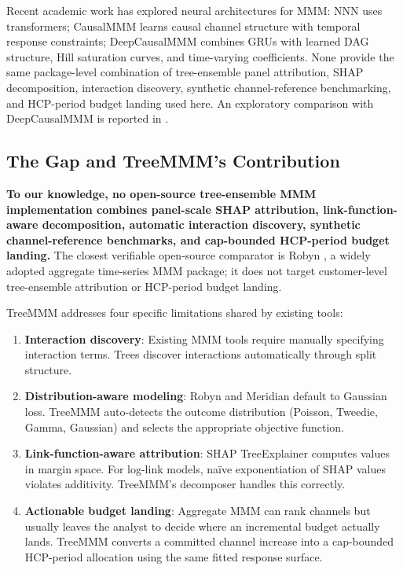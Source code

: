 \documentclass[review,12pt]{elsarticle}
\begin{document}
Recent academic work has explored neural architectures for MMM: NNN
\cite{mulc2025nnn} uses transformers; CausalMMM \cite{gong2024causalmmm} learns
causal channel structure with temporal response constraints; DeepCausalMMM
\cite{tirumala2025deepcausalmmm} combines GRUs with learned DAG structure, Hill
saturation curves, and time-varying
coefficients. None provide the same package-level combination of tree-ensemble
panel attribution, SHAP decomposition, interaction discovery, synthetic
channel-reference benchmarking, and HCP-period budget landing used here. An
exploratory comparison with DeepCausalMMM is reported in .

\subsection{The Gap and TreeMMM's Contribution}
\label{sec:intro:gap}

\textbf{To our knowledge, no open-source tree-ensemble MMM implementation combines
panel-scale SHAP attribution, link-function-aware decomposition, automatic
interaction discovery, synthetic channel-reference benchmarks, and cap-bounded
HCP-period budget landing.} The closest verifiable open-source comparator is
Robyn \cite{runge2024robyn}, a widely adopted aggregate time-series MMM package;
it does not target customer-level tree-ensemble attribution or HCP-period budget
landing.

TreeMMM addresses four specific limitations shared by existing tools:

\begin{enumerate}
\item \textbf{Interaction discovery}: Existing MMM tools require manually
  specifying interaction terms. Trees discover interactions automatically
  through split structure.
\item \textbf{Distribution-aware modeling}: Robyn and Meridian default to
  Gaussian loss. TreeMMM auto-detects the outcome distribution (Poisson,
  Tweedie, Gamma, Gaussian) and selects the appropriate objective function.
\item \textbf{Link-function-aware attribution}: SHAP TreeExplainer
  \cite{lundberg2017unified} computes
  values in margin space. For log-link models, na\"{i}ve exponentiation of
  SHAP values violates additivity. TreeMMM's decomposer handles this correctly.
\item \textbf{Actionable budget landing}: Aggregate MMM can rank channels but
  usually leaves the analyst to decide where an incremental budget actually
  lands. TreeMMM converts a committed channel increase into a cap-bounded
  HCP-period allocation using the same fitted response surface.
\end{enumerate}
\end{document}
